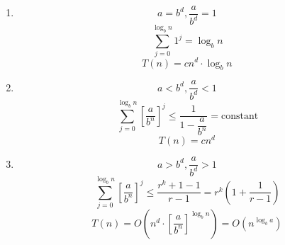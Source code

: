 \documentclass[11pt]{article}
\begin{document}
		\begin{enumerate}
			\item
				\[a=b^d, \frac{a}{b^d} = 1\]
				\[\sum_{j=0}^{\log_b n}1^j = \log_b n\]
				\begin{equation}
					T(n) = cn^d\cdot\log_b n
				\end{equation}
			\item
				\[a<b^d, \frac{a}{b^d}<1\]
				\[\sum_{j=0}^{\log_b n}\left[\frac{a}{b^n}\right]^j \leq \dfrac{1}{1 - \dfrac{a}{b^n}} = \text{constant}\]
				\begin{equation}
					T(n) = cn^d
				\end{equation}
			\item
				\[a>b^d, \frac{a}{b^d} > 1\]
				\[\sum_{j=0}^{\log_b n}\left[\frac{a}{b^n}\right]^j \leq \frac{r^k+1 -1}{r-1} = r^k\left(1 + \frac{1}{r-1}\right)\]
				\begin{equation}
					T(n)=O\left(n^d\cdot\left[\frac{a}{b^n}\right]^{\log_b n}\right) = O(n^{\log_b a})
				\end{equation}
		\end{enumerate}
\end{document}
